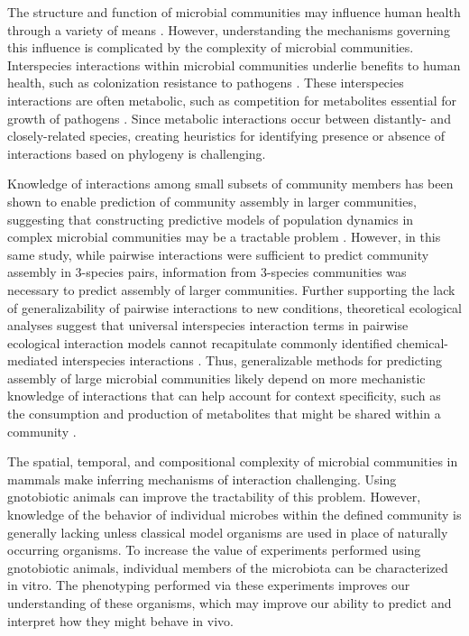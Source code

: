 \documentclass[11pt,twocolumn,notitlepage,openany,twoside]{book}
\begin{document}
\begin{refsection}
The structure and function of microbial communities may influence human health through a variety of means \cite{Turnbaugh2007-cd}. However, understanding the mechanisms governing this influence is complicated by the complexity of microbial communities. Interspecies interactions within microbial communities underlie benefits to human health, such as colonization resistance to pathogens \cite{Britton2014-wm, Buffie2013-xt}. These interspecies interactions are often metabolic, such as competition for metabolites essential for growth of pathogens \cite{Gillis2018-mt,Lawley2013-ez,Stecher2008-bc}. Since metabolic interactions occur between distantly-\cite{Fischbach2011-wg} and closely-related \cite{Rakoff-Nahoum2014-dw} species, creating heuristics for identifying presence or absence of interactions based on phylogeny is challenging.

Knowledge of interactions among small subsets of community members has been shown to enable prediction of community assembly in larger communities, suggesting that constructing predictive models of population dynamics in complex microbial communities may be a tractable problem \cite{Friedman2017-zn}. However, in this same study, while pairwise interactions were sufficient to predict community assembly in 3-species pairs, information from 3-species communities was necessary to predict assembly of larger communities. Further supporting the lack of generalizability of pairwise interactions to new conditions, theoretical ecological analyses suggest that universal interspecies interaction terms in pairwise ecological interaction models cannot recapitulate commonly identified chemical-mediated interspecies interactions \cite{Momeni2017-it}. Thus, generalizable methods for predicting assembly of large microbial communities likely depend on more mechanistic knowledge of interactions that can help account for context specificity, such as the consumption and production of metabolites that might be shared within a community \cite{Goldford2017-zx}.

The spatial, temporal, and compositional complexity of microbial communities in mammals make inferring mechanisms of interaction challenging. Using gnotobiotic animals can improve the tractability of this problem. However, knowledge of the behavior of individual microbes within the defined community is generally lacking unless classical model organisms are used in place of naturally occurring organisms. To increase the value of experiments performed using gnotobiotic animals, individual members of the microbiota can be characterized in vitro. The phenotyping performed via these experiments improves our understanding of these organisms, which may improve our ability to predict and interpret how they might behave in vivo.


\end{refsection}
\end{document}
